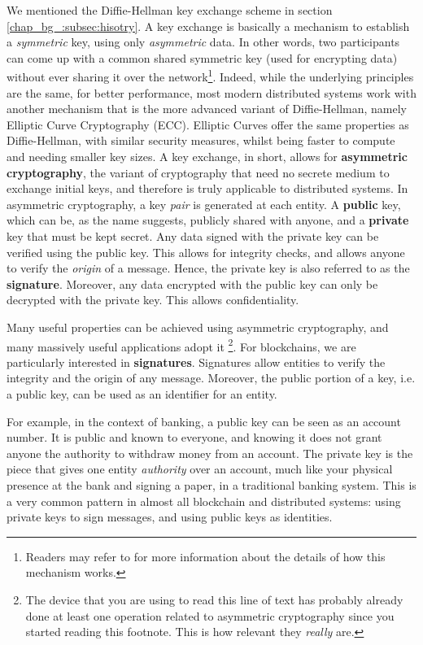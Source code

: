 We mentioned the Diffie-Hellman key exchange scheme in section \ref{chap_bg_:subsec:hisotry}. A key
exchange is basically a mechanism to establish a \textit{symmetric} key, using only
\textit{asymmetric} data. In other words, two participants can come up with a common shared
symmetric key (used for encrypting data) without ever sharing it over the network\footnote{Readers
may refer to \cite{diffieNewDirectionsCryptography1976} for more information about the details of
how this mechanism works.}. Indeed, while the underlying principles are the same, for better
performance, most modern distributed systems work with another mechanism that is the more advanced
variant of Diffie-Hellman, namely Elliptic Curve Cryptography (ECC). Elliptic Curves offer the same
properties as Diffie-Hellman, with similar security measures, whilst being faster to compute and
needing smaller key sizes. A key exchange, in short, allows for \textbf{asymmetric cryptography},
the variant of cryptography that need no secrete medium to exchange initial keys, and therefore is
truly applicable to distributed systems. In asymmetric cryptography, a key \textit{pair} is
generated at each entity. A \textbf{public} key, which can be, as the name suggests, publicly shared
with anyone, and a \textbf{private} key that must be kept secret. Any data signed with the private
key can be verified using the public key. This allows for integrity checks, and allows anyone to
verify the \textit{origin} of a message. Hence, the private key is also referred to as the
\textbf{signature}. Moreover, any data encrypted with the public key can only be decrypted with the
private key. This allows confidentiality.

Many useful properties can be achieved using asymmetric cryptography, and many massively useful
applications adopt it \footnote{The device that you are using to read this line of text has probably
already done at least one operation related to asymmetric cryptography since you started reading
this footnote. This is how relevant they \textit{really} are.}. For blockchains, we are particularly
interested in \textbf{signatures}. Signatures allow entities to verify the integrity and the origin
of any message. Moreover, the public portion of a key, i.e. a public key, can be used as an
identifier for an entity.

For example, in the context of banking, a public key can be seen as an account number. It is public
and known to everyone, and knowing it does not grant anyone the authority to withdraw money from an
account. The private key is the piece that gives one entity \textit{authority} over an account, much
like your physical presence at the bank and signing a paper, in a traditional banking system. This
is a very common pattern in almost all blockchain and distributed systems: using private keys to
sign messages, and using public keys as identities.


